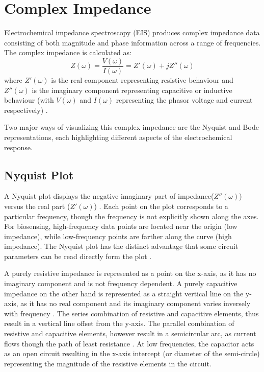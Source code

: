 \section{Complex Impedance}
Electrochemical impedance spectroscopy (EIS) produces complex impedance data consisting of both magnitude and phase information across a range of frequencies. The complex impedance is calculated as:
\begin{equation}
    Z(\omega) = \frac{V(\omega)}{I(\omega)} = Z'(\omega) + jZ''(\omega)
\end{equation}
where $Z'(\omega)$ is the real component representing resistive behaviour and $Z''(\omega)$ is the imaginary component representing capacitive or inductive behaviour (with $V(\omega)$ and $I(\omega)$ representing the phasor voltage and current respectively) \cite{lazanasErratumElectrochemicalImpedance2025}.

Two major ways of visualizing this complex impedance are the Nyquist and Bode representations, each highlighting different aspects of the electrochemical response.

\subsection{Nyquist Plot}
A Nyquist plot displays the negative imaginary part of impedance($Z''(\omega)$) versus the real part ($Z'(\omega)$) \cite{BodeNyquistPlot}. Each point on the plot corresponds to a particular frequency, though the frequency is not explicitly shown along the axes. For biosensing, high-frequency data points are located near the origin (low impedance), while low-frequency points are farther along the curve (high impedance). The Nyquist plot has the distinct advantage that some circuit parameters can be read directly form the plot \cite{BodeNyquistPlot}. 

A purely resistive impedance is represented as a point on the x-axis, as it has no imaginary component and is not frequency dependent. A purely capacitive impedance on the other hand is represented as a straight vertical line on the y-axis, as it has no real component and its imaginary component varies inversely with frequency \cite{BodeNyquistPlot}. The series combination of resistive and capacitive elements, thus result in a vertical line offset from the y-axis. The parallel combination of resistive and capacitive elements, however result in a semicircular arc, as current flows though the path of least resistance \cite{BodeNyquistPlot}. At low frequencies, the capacitor acts as an open circuit resulting in the x-axis intercept (or diameter of the semi-circle) representing the magnitude of the resistive elements in the circuit.

